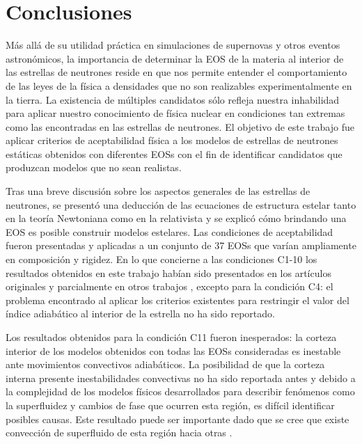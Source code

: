 \chapter{Conclusiones}
\noindent Más allá de su utilidad práctica en simulaciones de supernovas y otros eventos astronómicos, la importancia de determinar la EOS de la materia al interior de las estrellas de neutrones reside en que nos permite entender el comportamiento de las leyes de la física a densidades que no son realizables experimentalmente en la tierra. La existencia de múltiples candidatos sólo refleja nuestra inhabilidad para aplicar nuestro conocimiento de física nuclear en condiciones tan extremas como las encontradas en las estrellas de neutrones. El objetivo de este trabajo fue aplicar criterios de aceptabilidad física a los modelos de estrellas de neutrones estáticas obtenidos con diferentes EOSs con el fin de identificar candidatos que produzcan modelos que no sean realistas. 

Tras una breve discusión sobre los aspectos generales de las estrellas de neutrones, se presentó una deducción de las ecuaciones de estructura estelar tanto en la teoría Newtoniana como en la relativista y se explicó cómo brindando una EOS es posible construir modelos estelares. Las condiciones de aceptabilidad fueron presentadas y aplicadas a un conjunto de 37 EOSs que varían ampliamente en composición y rigidez. En lo que concierne a las condiciones C1-10 los resultados obtenidos en este trabajo habían sido presentados en los artículos originales y parcialmente en otros trabajos \cite{Ozel2016,Read2009}, excepto para la condición C4: el problema encontrado al aplicar los criterios existentes para restringir el valor del índice adiabático al interior de la estrella no ha sido reportado. 

Los resultados obtenidos para la condición C11 fueron inesperados: la corteza interior de los modelos obtenidos con todas las EOSs consideradas es inestable ante movimientos convectivos adiabáticos. La posibilidad de que la corteza interna presente inestabilidades convectivas no ha sido reportada antes y debido a la complejidad de los modelos físicos desarrollados para describir fenómenos como la superfluidez y cambios de fase que ocurren esta región, es difícil identificar posibles causas. Este resultado puede ser importante dado que se cree que existe convección de superfluido de esta región hacia otras \cite{Haensel2007}. 

